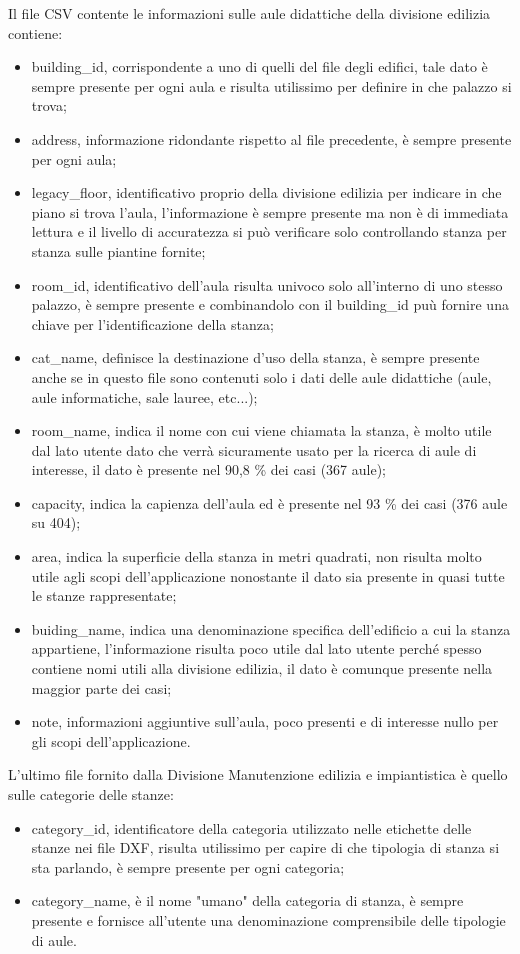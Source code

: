 \documentclass[12pt]{report}
\begin{document}
Il file CSV contente le informazioni sulle aule didattiche della divisione edilizia contiene:
\begin{itemize}
\item building\_id, corrispondente a uno di quelli del file degli edifici, tale dato è sempre presente per ogni aula e risulta utilissimo per definire in che palazzo si trova;
\item address, informazione ridondante rispetto al file precedente, è sempre presente per ogni aula;
\item legacy\_floor, identificativo proprio della divisione edilizia per indicare in che piano si trova l'aula, l'informazione è sempre presente ma non è di immediata lettura e il livello di accuratezza si può verificare solo controllando stanza per stanza sulle piantine fornite;
\item room\_id, identificativo dell'aula risulta univoco solo all'interno di uno stesso palazzo, è sempre presente e combinandolo con il building\_id puù fornire una chiave per l'identificazione della stanza;
\item cat\_name, definisce la destinazione d'uso della stanza, è sempre presente anche se in questo file sono contenuti solo i dati delle aule didattiche (aule, aule informatiche, sale lauree, etc...);
\item room\_name, indica il nome con cui viene chiamata la stanza, è molto utile dal lato utente dato che verrà sicuramente usato per la ricerca di aule di interesse, il dato è presente nel 90,8 \% dei casi (367 aule);
\item capacity, indica la capienza dell'aula ed è presente nel 93 \% dei casi (376 aule su 404);
\item area, indica la superficie della stanza in metri quadrati, non risulta molto utile agli scopi dell'applicazione nonostante il dato sia presente in quasi tutte le stanze rappresentate;
\item buiding\_name, indica una denominazione specifica dell'edificio a cui la stanza appartiene, l'informazione risulta poco utile dal lato utente perché spesso contiene nomi utili alla divisione edilizia, il dato è comunque presente nella maggior parte dei casi;
\item note, informazioni aggiuntive sull'aula, poco presenti e di interesse nullo per gli scopi dell'applicazione.    
\end{itemize}

L'ultimo file fornito dalla Divisione Manutenzione edilizia e impiantistica è quello sulle categorie delle stanze:
\begin{itemize}
\item category\_id, identificatore della categoria utilizzato nelle etichette delle stanze nei file DXF, risulta utilissimo per capire di che tipologia di stanza si sta parlando, è sempre presente per ogni categoria;
\item category\_name, è il nome "umano"  della categoria di stanza, è sempre presente e fornisce all'utente una denominazione comprensibile delle tipologie di aule.
\end{itemize} 
\end{document}
